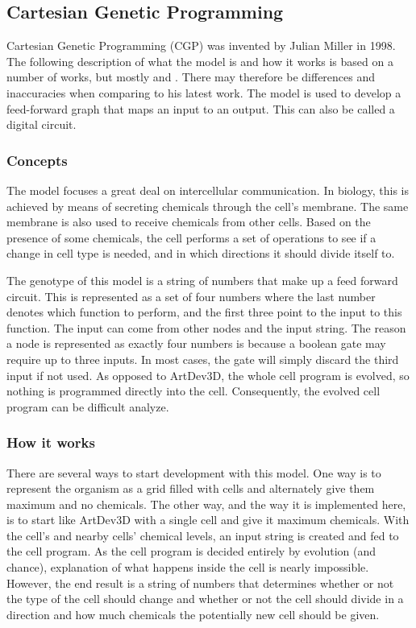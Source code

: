\subsection{Cartesian Genetic Programming}
Cartesian Genetic Programming (CGP) was invented by Julian Miller in 1998. The following description of what the model is and how it works is based on a number of works, but mostly \cite{mteurogp2000} and \cite{ecal2003}. There may therefore be differences and inaccuracies when comparing to his latest work. The model is used to develop a feed-forward graph that maps an input to an output. This can also be called a digital circuit.

\subsubsection{Concepts}
The model focuses a great deal on intercellular communication. In biology, this is achieved by means of secreting chemicals through the cell's membrane. The same membrane is also used to receive chemicals from other cells. Based on the presence of some chemicals, the cell performs a set of operations to see if a change in cell type is needed, and in which directions it should divide itself to.

The genotype of this model is a string of numbers that make up a feed forward circuit. This is represented as a set of four numbers where the last number denotes which function to perform, and the first three point to the input to this function. The input can come from other nodes and the input string. The reason a node is represented as exactly four numbers is because a boolean gate may require up to three inputs. In most cases, the gate will simply discard the third input if not used. As opposed to ArtDev3D, the whole cell program is evolved, so nothing is programmed directly into the cell. Consequently, the evolved cell program can be difficult analyze.

\subsubsection{How it works}
There are several ways to start development with this model. One way is to represent the organism as a grid filled with cells and alternately give them maximum and no chemicals. The other way, and the way it is implemented here, is to start like ArtDev3D with a single cell and give it maximum chemicals. With the cell's and nearby cells' chemical levels, an input string is created and fed to the cell program. As the cell program is decided entirely by evolution (and chance), explanation of what happens inside the cell is nearly impossible. However, the end result is a string of numbers that determines whether or not the type of the cell should change and whether or not the cell should divide in a direction and how much chemicals the potentially new cell should be given.


